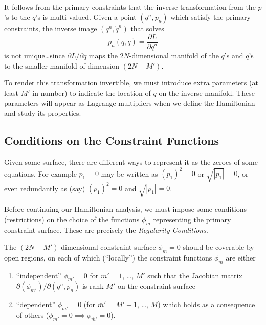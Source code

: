 \M
It follows from the primary constraints that the inverse transformation
from the $p$'s to the $q$'s is multi-valued. Given a point $(q^{n}, p_{n})$
which satisfy the primary constraints, the inverse image $(q^{n}, \dot{q}^{n})$
that solves
\begin{equation}
  p_{n}(q,\dot{q}) = \frac{\partial L}{\partial\dot{q}^{n}}
\end{equation}
is not unique\dots since $\partial L/\partial q$ maps the
$2N$-dimensional manifold of the $q$'s and $\dot{q}$'s to the smaller
manifold of dimension $(2N-M')$.


To render this transformation invertible, we must introduce extra
parameters (at least $M'$ in number) to indicate the location of
$\dot{q}$ on the inverse manifold. These parameters will appear as
Lagrange multipliers when we define the Hamiltonian and study its
properties.

\subsection{Conditions on the Constraint Functions}

\label{n:regularity-conditions:motivating-example}
Given some surface, there are different ways to represent it as the
zeroes of some equations. For example $p_{1}=0$ may be written as
$(p_{1})^{2}=0$ or $\sqrt{|p_{1}|}=0$, or even redundantly as (say)
$(p_{1})^{2}=0$ and $\sqrt{|p_{1}|}=0$.

Before continuing our Hamiltonian analysis, we must impose some
conditions (restrictions) on the choice of the functions $\phi_{m}$
representing the primary constraint surface. These are precisely the
\emph{Regularity Conditions}.

\label{n:constrained-hamiltonian:regularity-cond}
The $(2N-M')$-dimensional constraint surface $\phi_{m}=0$ should be
coverable by open regions, on each of which (``locally'') the
constraint functions $\phi_{m}$ are either
\begin{enumerate}
  \item ``independent'' $\phi_{m'}=0$ for $m'=1$, \dots, $M'$ such that
    the Jacobian matrix $\partial(\phi_{m'})/\partial(q^{n},p_{n})$ is
    rank $M'$ on the constraint surface
  \item ``dependent'' $\phi_{\bar{m}'}=0$ (for $\bar{m}'=M'+1$, \dots,
    $M$) which holds as a consequence of others ($\phi_{m'}=0\implies\phi_{\bar{m}'}=0$).
\end{enumerate}

